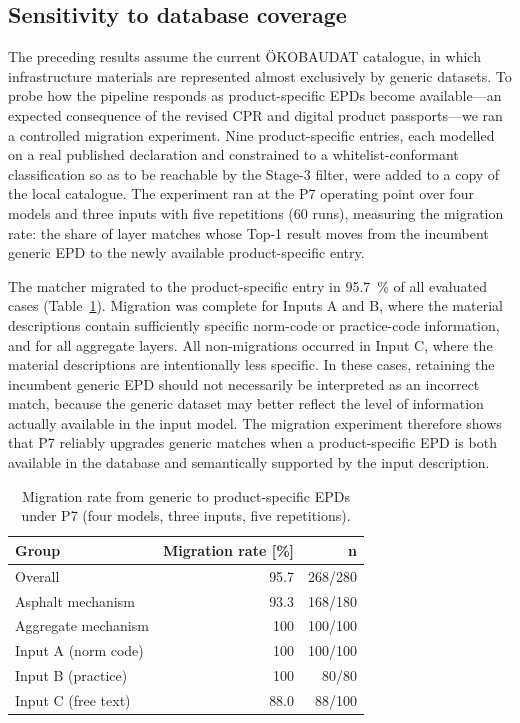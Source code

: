 \documentclass[10pt, a4paper, twocolumn]{article}
\begin{document}
\subsection{Sensitivity to database coverage}
\label{sec:coverage}

The preceding results assume the current \"OKOBAUDAT catalogue, in which
infrastructure materials are represented almost exclusively by generic datasets.
To probe how the pipeline responds as product-specific EPDs become available---an
expected consequence of the revised CPR and digital product passports---we ran a
controlled migration experiment. Nine product-specific entries, each modelled on a
real published declaration and constrained to a whitelist-conformant classification
so as to be reachable by the Stage-3 filter, were added to a copy of the local
catalogue. The experiment ran at the P7 operating point over four models and three
inputs with five repetitions (60 runs), measuring the migration rate: the share of
layer matches whose Top-1 result moves from the incumbent generic EPD to the newly
available product-specific entry.

The matcher migrated to the product-specific entry in 95.7~\% of all evaluated cases (Table~\ref{tab:migration}). Migration was complete for Inputs A and B, where the material descriptions contain sufficiently specific norm-code or practice-code information, and for all aggregate layers. All non-migrations occurred in Input C, where the material descriptions are intentionally less specific. In these cases, retaining the incumbent generic EPD should not necessarily be interpreted as an incorrect match, because the generic dataset may better reflect the level of information actually available in the input model. The migration experiment therefore shows that P7 reliably upgrades generic matches when a product-specific EPD is both available in the database and semantically supported by the input description.


\begin{table}[htbp]
  \caption{Migration rate from generic to product-specific EPDs under P7
           (four models, three inputs, five repetitions).}
  \label{tab:migration}
  \centering
  \small
  \begin{tabular}{lrr}
    \toprule
    \textbf{Group} & \textbf{Migration rate [\%]} & \textbf{n} \\
    \midrule
    Overall               & 95.7 & 268/280 \\
    \;Asphalt mechanism   & 93.3 & 168/180 \\
    \;Aggregate mechanism & 100  & 100/100 \\
    Input A (norm code)   & 100  & 100/100 \\
    Input B (practice)    & 100  & 80/80   \\
    Input C (free text)   & 88.0 & 88/100  \\
    \bottomrule
  \end{tabular}
\end{table}
\end{document}
